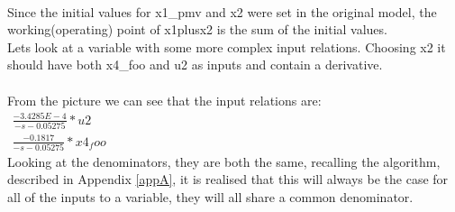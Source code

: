\setlength\fboxsep{0pt}
\setlength\fboxrule{0.5pt}
\\\newline
Since the initial values for x1\_pmv and x2 were set in the original model, the working(operating) point of x1plusx2 is the sum of the initial values.\\\newline
Lets look at a variable with some more complex input relations. Choosing x2 it should have both x4\_foo and u2 as inputs and contain a derivative.\\\newline
\setlength\fboxsep{0pt}
\setlength\fboxrule{0.5pt}
\\\newline
From the picture we can see that the input relations are:\\
$\begin{array}{rcl} \frac{-3.4285E-4}{-s -0.05275}*u2 \end{array}$\\
$\begin{array}{rcl} \frac{-0.1817}{-s -0.05275}*x4_foo \end{array}$\\\newline
Looking at the denominators, they are both the same, recalling the algorithm, described in Appendix \ref{appA}, it is realised that this will always be the case for all of the inputs to a variable, they will all share a common denominator.